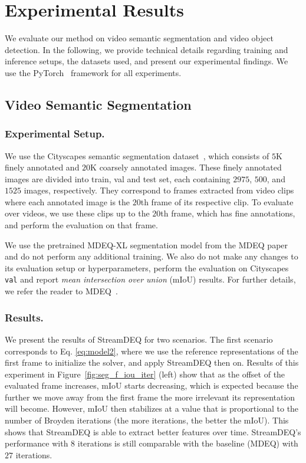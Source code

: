 \documentclass[runningheads]{llncs}
\begin{document}
\section{Experimental Results} \label{sec:experiments}


We evaluate our method on video semantic segmentation and video object detection. In the following, we provide technical details regarding training and inference setups, the datasets used, and present our experimental findings. We use the PyTorch~\cite{pytorch} framework for all experiments. 


\subsection{Video Semantic Segmentation}


\subsubsection{Experimental Setup.}


We use the Cityscapes semantic segmentation dataset~\cite{cityscapesdataset}, which consists of $5$K finely annotated and $20$K coarsely annotated images. These finely annotated images are divided into train, val and test set, each containing $2975$, $500$, and $1525$ images, respectively. They correspond to frames extracted from video clips where each annotated image is the $20$th frame of its respective clip. To evaluate over videos, we use these clips up to the $20$th frame, which has fine annotations, and perform the evaluation on that frame.


We use the pretrained MDEQ-XL segmentation model from the MDEQ paper~\cite{bai2020mdeq} and do not perform any additional training. We also do not make any changes to its evaluation setup or hyperparameters, perform the evaluation on Cityscapes \texttt{val} and report {\em mean intersection over union} (mIoU) results. For further details, we refer the reader to MDEQ~\cite{bai2020mdeq}.


\subsubsection{Results.}


We present the results of StreamDEQ for two scenarios. The first scenario corresponds to Eq. \ref{eq:model2}, where we use the reference representations of the first frame to initialize the solver, and apply StreamDEQ then on. Results of this experiment in Figure~\ref{fig:seg_f_iou_iter} (left) show that as the offset of the evaluated frame increases, mIoU starts decreasing, which is expected because the further we move away from the first frame the more irrelevant its representation will become. However, mIoU then stabilizes at a value that is proportional to the number of Broyden iterations (the more iterations, the better the mIoU). This shows that StreamDEQ is able to extract better features over time. StreamDEQ’s performance with $8$ iterations is still comparable with the baseline (MDEQ) with $27$ iterations.
\end{document}
